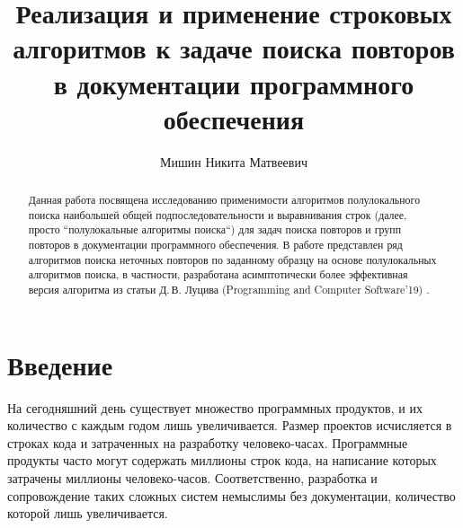\def\mcirc{\mathbin{\scalerel*{\circ}{j}}}
\def\msquare{\mathord{\scalerel*{\Box}{gX}}}


\title{Реализация и применение строковых алгоритмов к задаче поиска
повторов в документации программного обеспечения}


\author{Мишин Никита Матвеевич}



\maketitle


\begin{abstract}
Данная работа посвящена исследованию применимости алгоритмов полулокального поиска наибольшей общей подпоследовательности и выравнивания строк (далее, просто ``полулокальные алгоритмы поиска``) для задач поиска повторов и групп повторов в документации программного обеспечения.
В работе представлен ряд алгоритмов поиска неточных повторов по заданному образцу на основе полулокальных алгоритмов поиска, в частности, разработана асимптотически более эффективная версия алгоритма из статьи Д.\,В. Луцива  (Programming and Computer Software’19) .
\end{abstract}

\section*{Введение}

На сегодняшний день существует множество программных продуктов, и их количество с каждым годом лишь увеличивается.
Размер проектов исчисляется в строках кода и затраченных на разработку человеко-часах.
Программные продукты часто могут содержать миллионы строк кода, на написание которых затрачены миллионы человеко-часов.
Соответственно, разработка и сопровождение таких сложных систем немыслимы без документации, количество которой лишь увеличивается.

